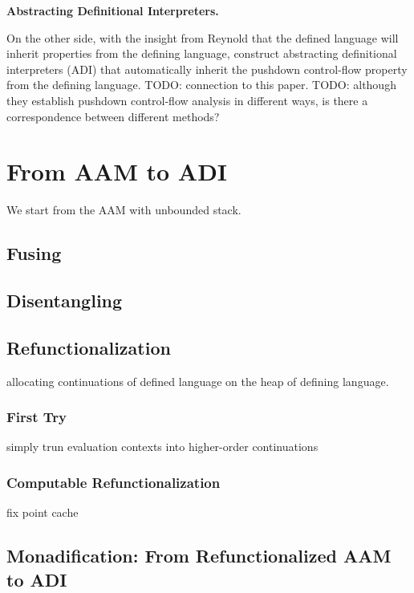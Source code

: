\documentclass[acmsmall,review,anonymous]{acmart}\settopmatter{printfolios=true,printccs=false,printacmref=false}
\begin{document}
\textbf{Abstracting Definitional Interpreters.}

On the other side, with the insight from Reynold that the defined language will inherit properties
from the defining language, \citeauthor{darais2017abstracting} construct abstracting 
definitional interpreters (ADI) that automatically inherit the pushdown control-flow 
property from the defining language.
TODO: connection to this paper.
TODO: although they establish pushdown control-flow analysis in different ways, 
is there a correspondence between different methods?


\section{From AAM to ADI}

We start from the AAM with unbounded stack.

\subsection{Fusing}

\subsection{Disentangling}

\subsection{Refunctionalization}

allocating continuations of defined language on the heap of defining language.

\subsubsection{First Try}

simply trun evaluation contexts into higher-order continuations

\subsubsection{Computable Refunctionalization}

fix point cache

\subsection{Monadification: From Refunctionalized AAM to ADI}
\end{document}
